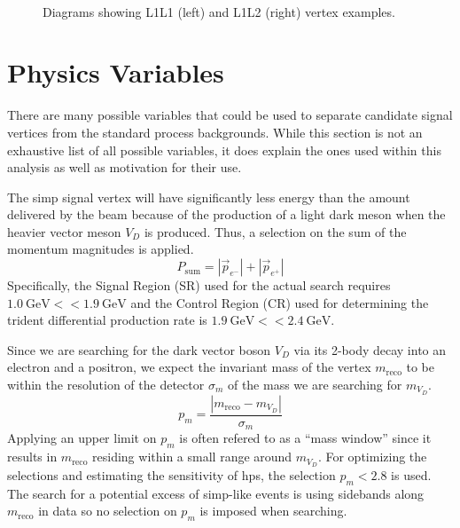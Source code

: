 \begin{figure}
  \centering
  \begin{subfigure}{0.48\textwidth}
    \centering
    \resizebox{\textwidth}{!}{}
  \end{subfigure}
  ~
  \begin{subfigure}{0.48\textwidth}
    \centering
    \resizebox{\textwidth}{!}{}
  \end{subfigure}
  \caption{Diagrams showing L1L1 (left) and L1L2 (right) vertex examples.}
  \label{fig:hps-reco-category-diagram}
\end{figure}

\section{Physics Variables}
\label{sec:hps:analysis:variables}
There are many possible variables that could be used to separate candidate signal
vertices from the standard process backgrounds.
While this section is not an exhaustive list of all possible variables,
it does explain the ones used within this analysis as well as motivation for
their use.

The \ac{simp} signal vertex will have significantly less energy than the amount
delivered by the beam because of the production of a light dark meson when the heavier
vector meson $V_D$ is produced.
Thus, a selection on the sum of the momentum magnitudes is applied.
\begin{equation}
  P_\mathrm{sum} = |\vec{p}_{e^-}|+|\vec{p}_{e^+}|
\end{equation}
Specifically, the Signal Region (SR) used for the actual search requires
$\qty{1.0}{\GeV} < $\Psum$ < \qty{1.9}{\GeV}$ and the Control Region (CR)
used for determining the trident differential production rate is
$\qty{1.9}{\GeV} < $\Psum$ < \qty{2.4}{\GeV}$.

Since we are searching for the dark vector boson $V_D$ via its
2-body decay into an electron and a positron, we expect the invariant mass of the vertex $m_\text{reco}$
to be within the resolution of the detector $\sigma_m$ of the mass we are searching for $m_{V_D}$.
\begin{equation}
  p_m = \frac{|m_\text{reco}-m_{V_D}|}{\sigma_m}
\end{equation}
Applying an upper limit on $p_m$ is often refered to as a ``mass window''
since it results in $m_\text{reco}$ residing within a small range around $m_{V_D}$.
For optimizing the selections and estimating the sensitivity of \ac{hps},
the selection $p_m < 2.8$ is used.
The search for a potential excess of \ac{simp}-like events is using sidebands
along $m_\mathrm{reco}$ in data so no selection on $p_m$ is imposed when searching.


